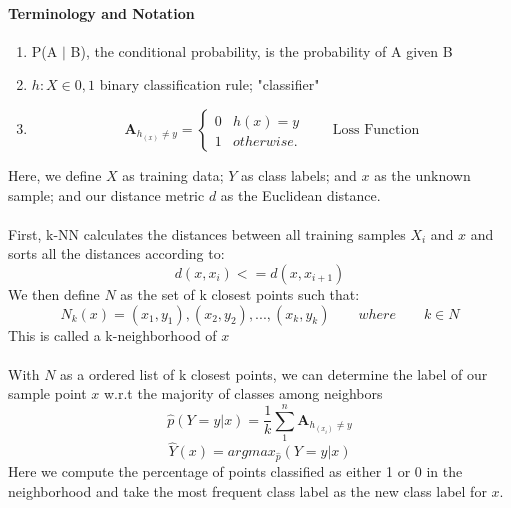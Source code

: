 \documentclass{report}
\begin{document}
\paragraph*{Terminology and Notation }\cite{4}
\begin{enumerate}
	\item P(A $|$ B), the conditional probability, is the probability of A given B
	\item $h : X \in 0, 1$  \qquad  \qquad \textrm{binary classification rule; 
	"classifier" }
	\item \begin{equation*}
	  \textbf{A}_{h_(x) \neq y} = \begin{cases}
	        0 & h(x) = y 
	        \\ 
	        1 &  otherwise.
	        \end{cases} \qquad \textrm{Loss Function}
	 \end{equation*}
\end{enumerate}
Here, we define $X$ as training data; $Y$ as class labels; and $x$ as the unknown sample; and our distance metric $d$ as the Euclidean distance.
\\ \\
First, k-NN calculates the distances between all  training samples $X_{i}$ and $x$ and sorts all the distances according to:
\begin{equation}
d(x,x_{i}) <= d(x,x_{i+1})
\end{equation}
We then define $N$ as the set of k closest points such that:
\begin{equation}
N_{k}(x) = (x_{1}, y_{1}), (x_{2}, y_{2}), ... , (x_{k}, y_{k}) \qquad where \qquad k \in N
\end{equation} 
This is called a k-neighborhood of $x$  \\ \\
With $N$ as a ordered list of k closest points, we can determine the label of our sample point $x$ w.r.t the majority of classes among neighbors
\begin{equation*}
\hat{p}(Y = y | x) = \frac{1}{k} \sum_{1}^{n} \textbf{A}_{h_(x_{i}) \neq y} 
\end{equation*}
\begin{equation}
\hat{Y}(x) = argmax_{\hat{p}}(Y = y |x)
\end{equation}
Here we compute the percentage of points classified as either 1 or 0 in the neighborhood and take the most frequent class label as the new class label for $x$.
 \newline\newline
\end{document}
